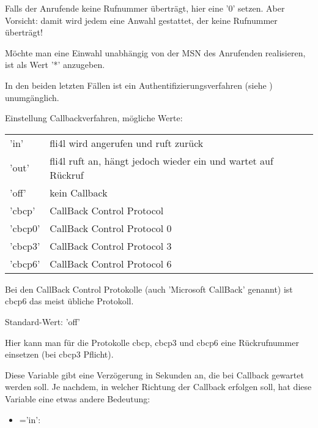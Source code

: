 \begin{description}
  Falls der Anrufende keine Rufnummer überträgt, hier eine '0' setzen.
  Aber Vorsicht: damit wird jedem eine Anwahl gestattet, der keine
  Rufnummer überträgt!
  
  Möchte man eine Einwahl unabhängig von der MSN
  des Anrufenden realisieren, ist als Wert '*' anzugeben.

  In den beiden letzten Fällen ist ein Authentifizierungsverfahren 
  (siehe ) unumgänglich.

  
  Einstellung Callbackverfahren, mögliche Werte:

  \begin{tabular}[h!]{ll}
        'in' &     fli4l wird angerufen und ruft zurück \\
        'out' &    fli4l ruft an, hängt jedoch wieder ein und wartet auf
        Rückruf \\
        'off' &    kein Callback\\
        'cbcp' &   CallBack Control Protocol\\
        'cbcp0' &  CallBack Control Protocol 0\\
        'cbcp3' &  CallBack Control Protocol 3\\
        'cbcp6' &  CallBack Control Protocol 6\\

  \end{tabular}

  Bei den CallBack Control Protokolle (auch 'Microsoft CallBack' genannt)
  ist cbcp6 das meist übliche Protokoll.

  Standard-Wert: 'off'


  Hier kann man für die Protokolle cbcp, cbcp3 und cbcp6 eine Rückrufnummer
  einsetzen (bei cbcp3 Pflicht).

  
  Diese Variable gibt eine Verzögerung in Sekunden an, die bei
  Callback gewartet werden soll. Je nachdem, in welcher Richtung der
  Callback erfolgen soll, hat diese Variable eine etwas andere
  Bedeutung:
  
  \begin{itemize}
  \item  {}='in':
    

\end{itemize}
\end{description}
